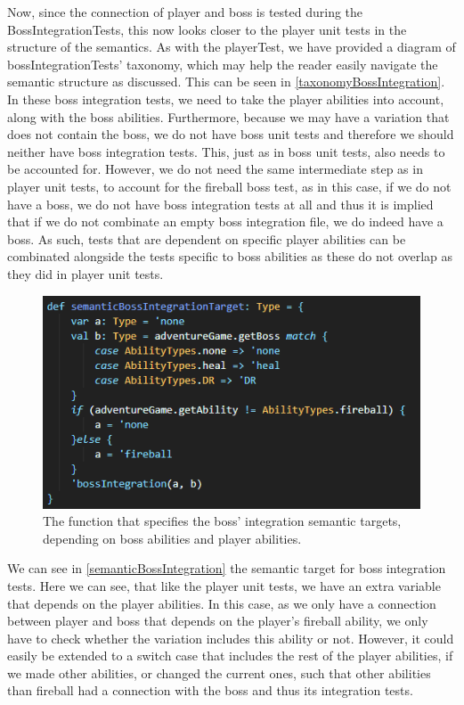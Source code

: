 Now, since the connection of player and boss is tested during the BossIntegrationTests, this now looks closer to the player unit tests in the structure of the semantics. As with the playerTest, we have provided a diagram of bossIntegrationTests' taxonomy, which may help the reader easily navigate the semantic structure as discussed. This can be seen in \autoref{taxonomyBossIntegration}. In these boss integration tests, we need to take the player abilities into account, along with the boss abilities. Furthermore, because we may have a variation that does not contain the boss, we do not have boss unit tests and therefore we should neither have boss integration tests. This, just as in boss unit tests, also needs to be accounted for. However, we do not need the same intermediate step as in player unit tests, to account for the fireball boss test, as in this case, if we do not have a boss, we do not have boss integration tests at all and thus it is implied that if we do not combinate an empty boss integration file, we do indeed have a boss. As such, tests that are dependent on specific player abilities can be combinated alongside the tests specific to boss abilities as these do not overlap as they did in player unit tests. 
\begin{figure}[]
    \centering
    \includegraphics[width=0.6\linewidth]{Materials/TestingDiscussion/semanticBossIntegrationTarget}
    \caption{The function that specifies the boss' integration semantic targets, depending on boss abilities and player abilities.}
    \label{semanticBossIntegration}
\end{figure}
We can see in \autoref{semanticBossIntegration} the semantic target for boss integration tests. Here we can see, that like the player unit tests, we have an extra variable that depends on the player abilities. In this case, as we only have a connection between player and boss that depends on the player's fireball ability, we only have to check whether the variation includes this ability or not. However, it could easily be extended to a switch case that includes the rest of the player abilities, if we made other abilities, or changed the current ones, such that other abilities than fireball had a connection with the boss and thus its integration tests. \\
